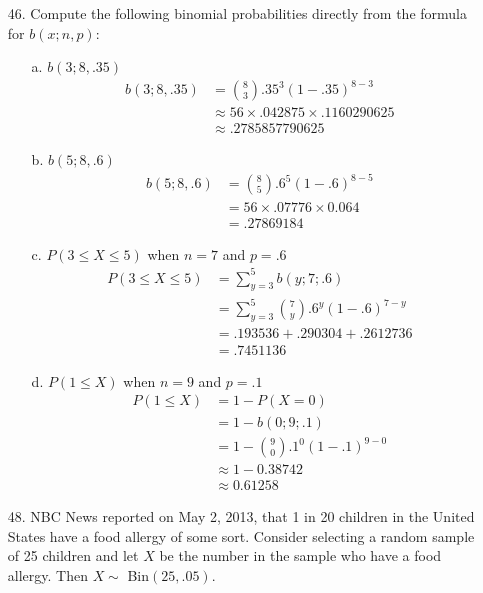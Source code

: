 \documentclass[letterpaper,12pt]{article}
\newcommand{\bp}[3]{%
  \binom{#2}{#1}#3^{#1}(1 - #3)^{#2 - #1}%
}
\begin{document}
\maketitle

\begin{enumerate}
  \item[46.]
    Compute the following binomial probabilities directly from the formula for $b(x; n, p)$:
    \begin{enumerate}
      \item[a.]
        $b(3; 8, .35)$
        \begin{align*}
          b(3; 8, .35) &= \bp{3}{8}{.35} \\
          &\approx 56 \times .042875 \times .1160290625 \\
          &\approx .2785857790625
        \end{align*}
      \item[b.]
        $b(5; 8, .6)$
        \begin{align*}
          b(5; 8, .6) &= \bp{5}{8}{.6}  \\
          &= 56 \times .07776 \times 0.064 \\
          &= .27869184
        \end{align*}
      \item[c.]
        $P(3 \le X \le 5)$ when $n = 7$ and $p = .6$
        \begin{align*}
          P(3 \le X \le 5) &= \sum_{y = 3}^5 b(y; 7; .6) \\
          &= \sum_{y = 3}^5 \bp{y}{7}{.6}  \\
          &= .193536 + .290304 + .2612736 \\
          &= .7451136
        \end{align*}
      \item[d.]
        $P(1 \le X)$ when $n = 9$ and $p = .1$
        \begin{align*}
          P(1 \le X) &= 1 - P(X = 0) \\
          &= 1 - b(0; 9; .1) \\
          &= 1 - \bp{0}{9}{.1} \\
          &\approx 1 - 0.38742 \\
          &\approx 0.61258
        \end{align*}
    \end{enumerate}
  \item[48.]
    NBC News reported on May 2, 2013, that 1 in 20 children in the United States have a food allergy of some sort. Consider selecting a random sample of 25 children and let $X$ be the number in the sample who have a food allergy. Then $X \sim$ Bin$(25, .05)$.

\end{enumerate}
\end{document}
